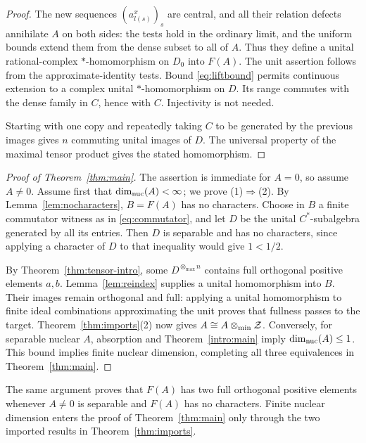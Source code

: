\begin{proof}
The new sequences \((a_{l(s)}^x)_s\) are central, and all their relation defects annihilate \(A\) on both sides: the tests hold in the ordinary limit, and the uniform bounds extend them from the dense subset to all of \(A\). Thus they define a unital rational-complex \(*\)-homomorphism on \(D_0\) into \(F(A)\). The unit assertion follows from the approximate-identity tests. Bound \eqref{eq:liftbound} permits continuous extension to a complex unital \(*\)-homomorphism on \(D\). Its range commutes with the dense family in \(C\), hence with \(C\). Injectivity is not needed.

Starting with one copy and repeatedly taking \(C\) to be generated by the previous images gives \(n\) commuting unital images of \(D\). The universal property of the maximal tensor product gives the stated homomorphism.
\end{proof}

\begin{proof}[Proof of Theorem~\ref{thm:main}]
The assertion is immediate for \(A=0\), so assume \(A\ne0\).
Assume first that $\dim_{\mathrm{nuc}}(A)<\infty$; we prove (1)$\Rightarrow$(2).
By Lemma~\ref{lem:nocharacters}, \(B=F(A)\) has no characters. Choose in \(B\) a finite commutator witness as in \eqref{eq:commutator}, and let \(D\) be the unital \(C^*\)-subalgebra generated by all its entries. Then \(D\) is separable and has no characters, since applying a character of \(D\) to that inequality would give \(1<1/2\).

By Theorem~\ref{thm:tensor-intro}, some \(D^{\otimes_{\max}n}\) contains full orthogonal positive elements \(a,b\). Lemma~\ref{lem:reindex} supplies a unital homomorphism into \(B\). Their images remain orthogonal and full: applying a unital homomorphism to finite ideal combinations approximating the unit proves that fullness passes to the target. Theorem~\ref{thm:imports}(2) now gives \(A\cong A\otimes_{\min}\mathcal Z\).
Conversely, for separable nuclear $A$, absorption and
Theorem~\ref{intro:main} imply $\dim_{\mathrm{nuc}}(A)\le1$. This bound implies
finite nuclear dimension, completing all three equivalences in
Theorem~\ref{thm:main}.
\end{proof}

\begin{remark}
The same argument proves that \(F(A)\) has two full orthogonal positive elements whenever \(A\ne0\) is separable and \(F(A)\) has no characters. Finite nuclear dimension enters the proof of Theorem~\ref{thm:main} only through the two imported results in Theorem~\ref{thm:imports}.
\end{remark}

